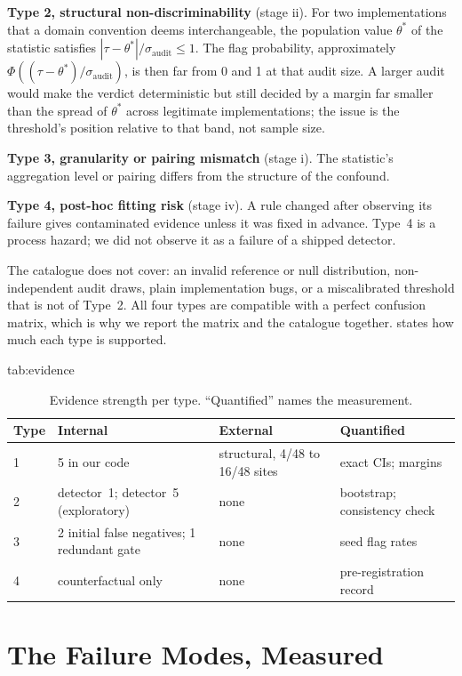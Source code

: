 \documentclass[pmlr,twocolumn,10pt]{jmlr}
\begin{document}
\textbf{Type 2, structural non-discriminability} (stage ii). For two
implementations that a domain convention deems interchangeable, the population
value $\theta^*$ of the statistic satisfies $|\tau-\theta^*|/\sigma_{\text{audit}}\le 1$.
The flag probability, approximately $\Phi((\tau-\theta^*)/\sigma_{\text{audit}})$, is then
far from 0 and 1 at that audit size. A larger audit would make the verdict
deterministic but still decided by a margin far smaller than the spread of
$\theta^*$ across legitimate implementations; the issue is the threshold's
position relative to that band, not sample size.

\textbf{Type 3, granularity or pairing mismatch} (stage i). The statistic's
aggregation level or pairing differs from the structure of the confound.

\textbf{Type 4, post-hoc fitting risk} (stage iv). A rule changed after
observing its failure gives contaminated evidence unless it was fixed in advance.
Type~4 is a process hazard; we did not observe it as a failure of a shipped
detector.

The catalogue does not cover: an invalid reference or null distribution,
non-independent audit draws, plain implementation bugs, or a miscalibrated
threshold that is not of Type~2. All four types are compatible with a perfect
confusion matrix, which is why we report the matrix and the catalogue together.
 states how much each type is supported.

\begin{table}[htbp]
\floatconts
  {tab:evidence}
  {\caption{Evidence strength per type. ``Quantified'' names the measurement.}}
  {\footnotesize\setlength{\tabcolsep}{2pt}%
  \begin{tabular}{@{}lp{2.0cm}p{1.9cm}p{2.3cm}@{}}
  \toprule
  \bfseries Type & \bfseries Internal & \bfseries External & \bfseries Quantified\\
  \midrule
  1 & 5 in our code & structural, 4/48 to 16/48 sites & exact CIs; margins\\
  2 & detector~1; detector~5 (exploratory) & none & bootstrap; consistency check\\
  3 & 2 initial false negatives; 1 redundant gate & none & seed flag rates\\
  4 & counterfactual only & none & pre-registration record\\
  \bottomrule
  \end{tabular}}
\end{table}

\section{The Failure Modes, Measured}
\label{sec:measured}
\end{document}
